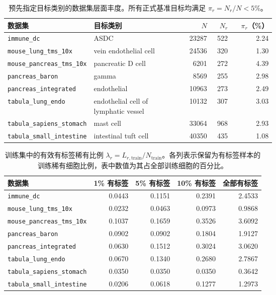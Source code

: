 \documentclass[pdflatex,sn-mathphys-num]{sn-jnl}
\theoremstyle{thmstyleone}%
\theoremstyle{thmstyletwo}%
\theoremstyle{thmstylethree}%
\begin{document}
\begin{table}[t]
\centering
\caption{预先指定目标类别的数据集层面丰度。所有正式基准目标均满足 $\pi_r=N_r/N<5\%$。}
\label{tab:target-abundance}
\scriptsize
\begin{tabular}{p{0.28\linewidth}p{0.34\linewidth}rrr}
\toprule
数据集 & 目标类别 & $N$ & $N_r$ & $\pi_r$（\%）\\
\midrule
\texttt{immune\_dc} & ASDC & 23287 & 522 & 2.24 \\
\texttt{mouse\_lung\_tms\_10x} & vein endothelial cell & 24536 & 320 & 1.30 \\
\texttt{mouse\_pancreas\_tms\_10x} & pancreatic D cell & 6201 & 272 & 4.39 \\
\texttt{pancreas\_baron} & gamma & 8569 & 255 & 2.98 \\
\texttt{pancreas\_integrated} & endothelial & 10963 & 273 & 2.49 \\
\texttt{tabula\_lung\_endo} & endothelial cell of lymphatic vessel & 10132 & 307 & 3.03 \\
\texttt{tabula\_sapiens\_stomach} & mast cell & 33064 & 968 & 2.93 \\
\texttt{tabula\_small\_intestine} & intestinal tuft cell & 40350 & 435 & 1.08 \\
\bottomrule
\end{tabular}
\end{table}

\begin{table}[t]
\centering
\caption{训练集中的有效有标签稀有比例 $\lambda_r=L_{r,\mathrm{train}}/N_{\mathrm{train}}$。各列表示保留为有标签样本的训练稀有细胞比例，表中数值为其占全部训练细胞的百分比。}
\label{tab:labeled-ratio}
\scriptsize
\begin{tabular}{lrrrr}
\toprule
数据集 & 1\% 有标签 & 5\% 有标签 & 10\% 有标签 & 全部有标签\\
\midrule
\texttt{immune\_dc} & 0.0443 & 0.1151 & 0.2391 & 2.4533 \\
\texttt{mouse\_lung\_tms\_10x} & 0.0232 & 0.0463 & 0.0973 & 0.9868 \\
\texttt{mouse\_pancreas\_tms\_10x} & 0.1037 & 0.1659 & 0.3526 & 3.6092 \\
\texttt{pancreas\_baron} & 0.0902 & 0.0902 & 0.1804 & 1.9127 \\
\texttt{pancreas\_integrated} & 0.0630 & 0.1512 & 0.3024 & 3.0620 \\
\texttt{tabula\_lung\_endo} & 0.0670 & 0.1340 & 0.2680 & 2.7867 \\
\texttt{tabula\_sapiens\_stomach} & 0.0350 & 0.0350 & 0.0350 & 0.3642 \\
\texttt{tabula\_small\_intestine} & 0.0206 & 0.0618 & 0.1277 & 1.2973 \\
\bottomrule
\end{tabular}
\end{table}
\end{document}
